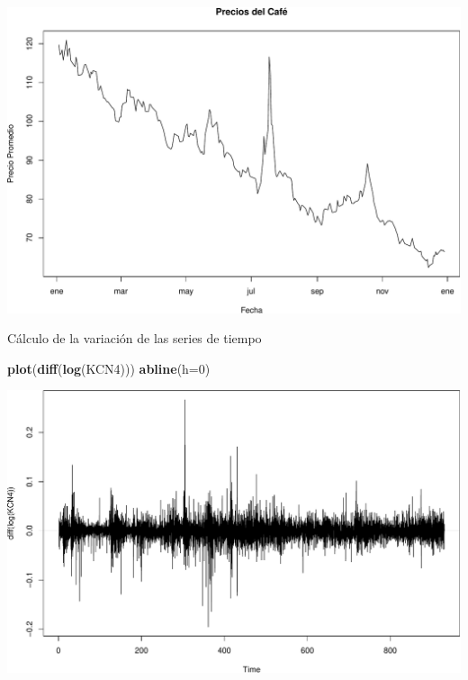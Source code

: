 \documentclass[
  10pt,
  ignorenonframetext,
  aspectratio=1612]{beamer}
\newenvironment{Shaded}{\begin{snugshade}}{\end{snugshade}}
\newcommand{\AttributeTok}[1]{\textcolor[rgb]{0.13,0.29,0.53}{#1}}
\newcommand{\DecValTok}[1]{\textcolor[rgb]{0.00,0.00,0.81}{#1}}
\newcommand{\FunctionTok}[1]{\textcolor[rgb]{0.13,0.29,0.53}{\textbf{#1}}}
\newcommand{\NormalTok}[1]{#1}
\newcommand{\SpecialCharTok}[1]{\textcolor[rgb]{0.81,0.36,0.00}{\textbf{#1}}}
\newcommand{\StringTok}[1]{\textcolor[rgb]{0.31,0.60,0.02}{#1}}
\begin{document}
\begin{frame}[fragile]{}
\label{section}
\begin{Shaded}
\end{Shaded}

\includegraphics{Informe_files/figure-beamer/unnamed-chunk-4-1.pdf}
\end{frame}

\begin{frame}[fragile]{Cálculo de la variación de las series de tiempo}
\label{cuxe1lculo-de-la-variaciuxf3n-de-las-series-de-tiempo}
\begin{Shaded}
\begin{Highlighting}[]
\FunctionTok{plot}\NormalTok{(}\FunctionTok{diff}\NormalTok{(}\FunctionTok{log}\NormalTok{(KCN4))) }
\FunctionTok{abline}\NormalTok{(}\AttributeTok{h=}\DecValTok{0}\NormalTok{)}
\end{Highlighting}
\end{Shaded}

\includegraphics{Informe_files/figure-beamer/unnamed-chunk-5-1.pdf}
\end{frame}
\end{document}
